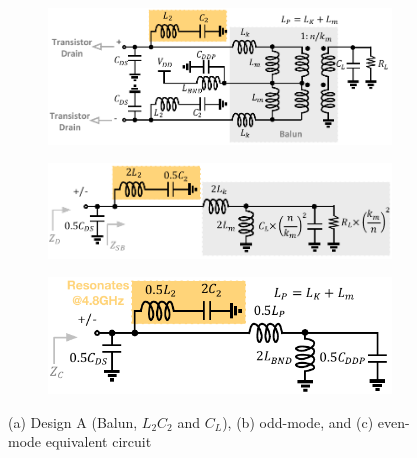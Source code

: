 \documentclass[conference]{IEEEtran}
\begin{document}
\begin{figure}[!t]
\captionsetup{font=footnotesize}
\centering
\begin{subfigure}{0.5\textwidth}
\centering
\includegraphics[width=1\textwidth]{Images/Design/Design_A_FC.pdf}
\caption{}
\label{fig:Design_A_FC}
\end{subfigure}
\begin{subfigure}[b]{0.35\textwidth}
\includegraphics[width=1\textwidth]{Images/Design/Design_A_Diff.pdf}
\caption{}
\label{fig:Design_A_Diff}
\end{subfigure}
\begin{subfigure}[b]{0.35\textwidth}
\includegraphics[width=1\textwidth]{Images/Design/Design_A_Com.pdf}
\caption{}
\label{fig:Design_A_Com}
\end{subfigure}
\caption{(a) Design A (Balun, $L_2C_2$ and $C_L$), (b) odd-mode, and (c) even-mode equivalent circuit }
\label{fig:Design_A}
\vspace{-0.2in}
\end{figure}
\end{document}
